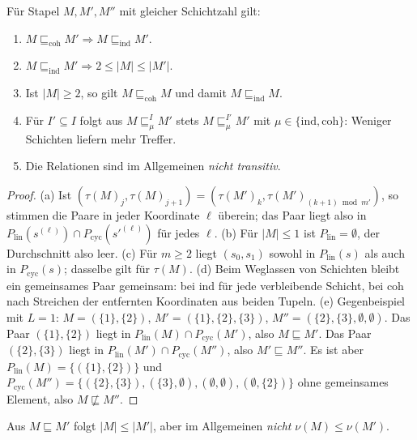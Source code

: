 \begin{lemma}
	\label{lem:univ_eigenschaften}
	Für Stapel $M,M',M''$ mit gleicher Schichtzahl gilt:
	\begin{enumerate}[label=(\alph*)]
	\item $M\sqsubseteq_{\mathrm{coh}}M' \Rightarrow M\sqsubseteq_{\mathrm{ind}}M'$.
	\item $M\sqsubseteq_{\mathrm{ind}}M' \Rightarrow 2\le|M|\le|M'|$.
	\item Ist $|M|\ge 2$, so gilt $M\sqsubseteq_{\mathrm{coh}}M$ und damit $M\sqsubseteq_{\mathrm{ind}}M$.
	\item Für $I'\subseteq I$ folgt aus $M\sqsubseteq_{\mu}^{I}M'$ stets $M\sqsubseteq_{\mu}^{I'}M'$ mit $\mu\in\{\mathrm{ind},\mathrm{coh}\}$: Weniger Schichten liefern mehr Treffer.
	\item Die Relationen sind im Allgemeinen \emph{nicht transitiv}.
	\end{enumerate}
\end{lemma}

\begin{proof}
	(a) Ist $(\tau(M)_j,\tau(M)_{j+1})=(\tau(M')_k,\tau(M')_{(k+1)\bmod m'})$, so stimmen die Paare in jeder Koordinate $\ell$ überein; das Paar liegt also in $P_{\mathrm{lin}}(s^{(\ell)})\cap P_{\mathrm{cyc}}(s'^{(\ell)})$ für jedes $\ell$.
	(b) Für $|M|\le 1$ ist $P_{\mathrm{lin}}=\emptyset$, der Durchschnitt also leer.
	(c) Für $m\ge2$ liegt $(s_0,s_1)$ sowohl in $P_{\mathrm{lin}}(s)$ als auch in $P_{\mathrm{cyc}}(s)$; dasselbe gilt für $\tau(M)$.
	(d) Beim Weglassen von Schichten bleibt ein gemeinsames Paar gemeinsam: bei ind für jede verbleibende Schicht, bei coh nach Streichen der entfernten Koordinaten aus beiden Tupeln.
	(e) Gegenbeispiel mit $L=1$: $M=(\{1\},\{2\})$, $M'=(\{1\},\{2\},\{3\})$, $M''=(\{2\},\{3\},\emptyset,\emptyset)$. Das Paar $(\{1\},\{2\})$ liegt in $P_{\mathrm{lin}}(M)\cap P_{\mathrm{cyc}}(M')$, also $M\sqsubseteq M'$. Das Paar $(\{2\},\{3\})$ liegt in $P_{\mathrm{lin}}(M')\cap P_{\mathrm{cyc}}(M'')$, also $M'\sqsubseteq M''$. Es ist aber $P_{\mathrm{lin}}(M)=\{(\{1\},\{2\})\}$ und $P_{\mathrm{cyc}}(M'')=\{(\{2\},\{3\}),(\{3\},\emptyset),(\emptyset,\emptyset),(\emptyset,\{2\})\}$ ohne gemeinsames Element, also $M\not\sqsubseteq M''$.
\end{proof}

\begin{lemma}
	\label{lem:univ_kanten}
	Aus $M\sqsubseteq M'$ folgt $|M|\le|M'|$, aber im Allgemeinen \emph{nicht} $\nu(M)\le\nu(M')$.
\end{lemma}

